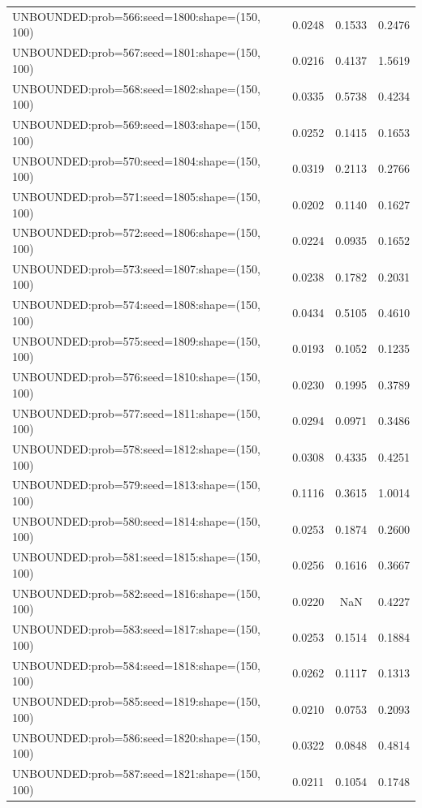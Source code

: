 \begin{longtable}{lccc}
UNBOUNDED:prob=566:seed=1800:shape=(150, 100) &   0.0248 &  0.1533 &  0.2476 \\
UNBOUNDED:prob=567:seed=1801:shape=(150, 100) &   0.0216 &  0.4137 &  1.5619 \\
UNBOUNDED:prob=568:seed=1802:shape=(150, 100) &   0.0335 &  0.5738 &  0.4234 \\
UNBOUNDED:prob=569:seed=1803:shape=(150, 100) &   0.0252 &  0.1415 &  0.1653 \\
UNBOUNDED:prob=570:seed=1804:shape=(150, 100) &   0.0319 &  0.2113 &  0.2766 \\
UNBOUNDED:prob=571:seed=1805:shape=(150, 100) &   0.0202 &  0.1140 &  0.1627 \\
UNBOUNDED:prob=572:seed=1806:shape=(150, 100) &   0.0224 &  0.0935 &  0.1652 \\
UNBOUNDED:prob=573:seed=1807:shape=(150, 100) &   0.0238 &  0.1782 &  0.2031 \\
UNBOUNDED:prob=574:seed=1808:shape=(150, 100) &   0.0434 &  0.5105 &  0.4610 \\
UNBOUNDED:prob=575:seed=1809:shape=(150, 100) &   0.0193 &  0.1052 &  0.1235 \\
UNBOUNDED:prob=576:seed=1810:shape=(150, 100) &   0.0230 &  0.1995 &  0.3789 \\
UNBOUNDED:prob=577:seed=1811:shape=(150, 100) &   0.0294 &  0.0971 &  0.3486 \\
UNBOUNDED:prob=578:seed=1812:shape=(150, 100) &   0.0308 &  0.4335 &  0.4251 \\
UNBOUNDED:prob=579:seed=1813:shape=(150, 100) &   0.1116 &  0.3615 &  1.0014 \\
UNBOUNDED:prob=580:seed=1814:shape=(150, 100) &   0.0253 &  0.1874 &  0.2600 \\
UNBOUNDED:prob=581:seed=1815:shape=(150, 100) &   0.0256 &  0.1616 &  0.3667 \\
UNBOUNDED:prob=582:seed=1816:shape=(150, 100) &   0.0220 &     NaN &  0.4227 \\
UNBOUNDED:prob=583:seed=1817:shape=(150, 100) &   0.0253 &  0.1514 &  0.1884 \\
UNBOUNDED:prob=584:seed=1818:shape=(150, 100) &   0.0262 &  0.1117 &  0.1313 \\
UNBOUNDED:prob=585:seed=1819:shape=(150, 100) &   0.0210 &  0.0753 &  0.2093 \\
UNBOUNDED:prob=586:seed=1820:shape=(150, 100) &   0.0322 &  0.0848 &  0.4814 \\
UNBOUNDED:prob=587:seed=1821:shape=(150, 100) &   0.0211 &  0.1054 &  0.1748 \\

\end{longtable}
